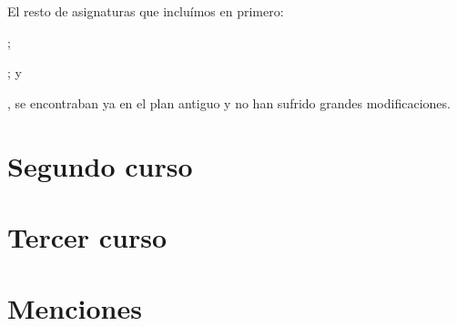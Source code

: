 El resto de asignaturas que incluímos en primero:
\subject{Fundamentos de Computadores};
\subject{Gestión de Organizaciones y Habilidades Profesionales}; y
\subject{Fundamentos en electricidad y electrónica},
se encontraban ya en el plan antiguo y no han sufrido grandes modificaciones.



\section{Segundo curso}

\section{Tercer curso}

\section{Menciones}

